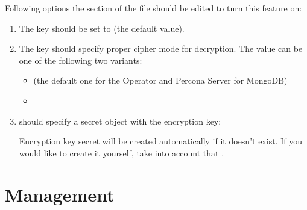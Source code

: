 \documentclass[letterpaper,10pt,english]{sphinxmanual}
\begin{document}
Following options the  section of the  file should
be edited to turn this feature on:
\begin{enumerate}
%
\item {} 
The  key should be set to  (the default
value).

\item {} 
The  key should specify proper cipher mode
for decryption. The value can be one of the following two variants:
\begin{itemize}
\item {} 
 (the default one for the Operator and Percona Server for
MongoDB)

\item {} 

\end{itemize}

\item {} 
 should specify a secret object with the
encryption key:

\begin{sphinxVerbatim}[commandchars=\\\{\}]
     
\end{sphinxVerbatim}

Encryption key secret will be created automatically if it
doesn’t exist. If you would like to create it yourself, take into account
that .

\end{enumerate}


\part{Management}
\label{\detokenize{index:management}}
\end{document}
